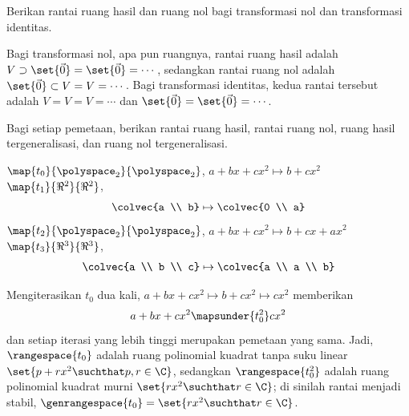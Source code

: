 \begin{exercises}
  \recommended \item 
    Berikan rantai ruang hasil dan ruang nol bagi transformasi nol dan
    transformasi identitas.
    \begin{answer}
      Bagi transformasi nol, apa pun ruangnya, rantai ruang hasil adalah
      \( V\supset\set{\vec{0}}=\set{\vec{0}}=\cdots\, \), sedangkan rantai
      ruang nol adalah \( \set{\vec{0}}\subset V=V=\cdots\, \).
      Bagi transformasi identitas, kedua rantai tersebut adalah
      \( V=V=V=\cdots \) dan
      \( \set{\vec{0}}=\set{\vec{0}}=\cdots\, \).
    \end{answer}
  \recommended\item 
     Bagi setiap pemetaan, berikan rantai ruang hasil, rantai ruang nol, ruang
     hasil tergeneralisasi, dan ruang nol tergeneralisasi.
     \begin{exparts}
       \partsitem $\map{t_0}{\polyspace_2}{\polyspace_2}$, 
         $a+bx+cx^2\mapsto b+cx^2$ 
       \partsitem $\map{t_1}{\Re^2}{\Re^2}$,
         \begin{equation*}
           \colvec{a \\ b}\mapsto\colvec{0 \\ a}
         \end{equation*}
       \partsitem $\map{t_2}{\polyspace_2}{\polyspace_2}$, 
         $a+bx+cx^2\mapsto b+cx+ax^2$
       \partsitem $\map{t_3}{\Re^3}{\Re^3}$,
         \begin{equation*}
           \colvec{a \\ b \\ c}\mapsto\colvec{a \\ a \\ b}
         \end{equation*}
     \end{exparts}
     \begin{answer}
       \begin{exparts}
         \partsitem Mengiterasikan $t_0$ dua kali,
           $a+bx+cx^2\mapsto b+cx^2\mapsto cx^2$
           memberikan
           \begin{equation*}
             a+bx+cx^2\mapsunder{t_0^2}cx^2
           \end{equation*}
           dan setiap iterasi yang lebih tinggi merupakan pemetaan yang sama.
           Jadi, $\rangespace{t_0}$ adalah ruang polinomial kuadrat tanpa suku
           linear $\set{p+rx^2\suchthat p,r\in \C}$, sedangkan
           $\rangespace{t_0^2}$ adalah ruang polinomial kuadrat murni
           $\set{rx^2\suchthat r\in \C}$; di sinilah rantai menjadi stabil,
           $\genrangespace{t_0}=\set{rx^2\suchthat r\in \C}$.
 

\end{exparts}
\end{answer}
\end{exercises}
